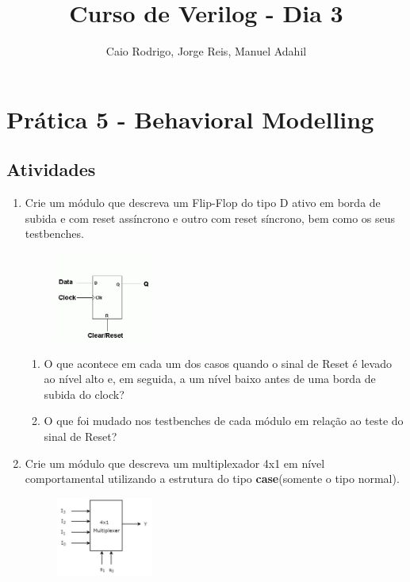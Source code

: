 \documentclass[a4paper]{article}
\title{Curso de Verilog - Dia 3}
\author{Caio Rodrigo, Jorge Reis, Manuel Adahil}
\date{} %
\begin{document}
\maketitle

\section*{Prática 5 - Behavioral Modelling}

\subsection*{Atividades}
\begin{enumerate}
\item Crie um módulo que descreva um Flip-Flop do tipo D ativo em borda de subida e com reset assíncrono e outro com reset síncrono, bem como os seus testbenches.

\begin{figure}[H]
\centering
\includegraphics[width=0.3\textwidth]{images/D_FF.png}
\end{figure}

\begin{enumerate}
\item O que acontece em cada um dos casos quando o sinal de Reset é levado ao nível alto e, em seguida, a um nível baixo antes de uma borda de subida do clock?

\item O que foi mudado nos testbenches de cada módulo em relação ao teste do sinal de Reset?

\end{enumerate}
\item Crie um módulo que descreva um multiplexador 4x1 em nível comportamental utilizando a estrutura do tipo \textbf{case}(somente o tipo normal). 

\begin{figure}[H]
\centering
\includegraphics[width=0.3\textwidth]{images/Mux_4x1.png}
\end{figure}


\end{enumerate}
\end{document}
